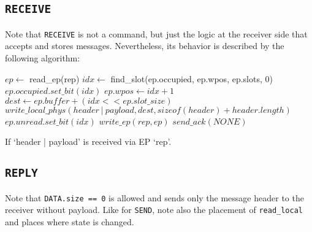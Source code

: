 \subsection{\texttt{RECEIVE}}

Note that \texttt{RECEIVE} is not a command, but just the logic at the receiver side that accepts
and stores messages. Nevertheless, its behavior is described by the following algorithm:

\begin{algorithm}[H]
    $ep \gets$ read\_ep(rep)\;
    \BlankLine
    $idx \gets$ find\_slot(ep.occupied, ep.wpos, ep.slots, 0)\;
    $ep.occupied.set\_bit(idx)$\;
    $ep.wpos \gets idx + 1$\;
    \BlankLine
    $dest \gets ep.buffer + (idx << ep.slot\_size)$\;
    $write\_local\_phys(header\ |\ payload, dest, sizeof(header) + header.length)$\;
    $ep.unread.set\_bit(idx)$\;
    $write\_ep(rep, ep)$\;
    \BlankLine
    \BlankLine
    $send\_ack(NONE)$\;
    \BlankLine
    \extend{}
    \caption{If `header | payload' is received via EP `rep'.}
\end{algorithm}

\subsection{\texttt{REPLY}}

Note that \texttt{DATA.size == 0} is allowed and sends only the message header to the receiver
without payload. Like for \texttt{SEND}, note also the placement of \texttt{read\_local} and places
where state is changed.

